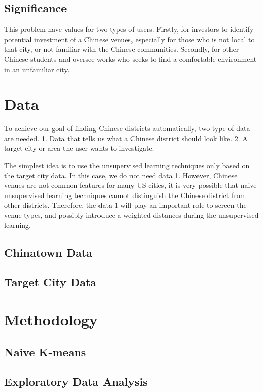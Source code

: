 \documentclass{article}
\begin{document}
\subsection{Significance}
This problem have values for two types of users. Firstly, for investors to identify potential investment of a Chinese venues, especially for those who is not local to that city, or not familiar with the Chinese communities. Secondly, for other Chinese students and oversee works who seeks to find a comfortable environment in an unfamiliar city.

\section{Data}
To achieve our goal of finding Chinese districts automatically, two type of data are needed. 
1. Data that tells us what a Chinese district should look like.
2. A target city or area the user wants to investigate.

The simplest idea is to use the unsupervised learning techniques only based on the target city data.
In this case, we do not need data 1.
However, Chinese venues are not common features for many US cities, it is very possible that naive unsupervised learning techniques cannot distinguish the Chinese district from other districts.
Therefore, the data 1 will play an important role to screen the venue types, and possibly introduce a weighted distances during the unsupervised learning.

\subsection{Chinatown Data}

\subsection{Target City Data}

\section{Methodology}
\subsection{Naive K-means}

\subsection{Exploratory Data Analysis}
\end{document}
